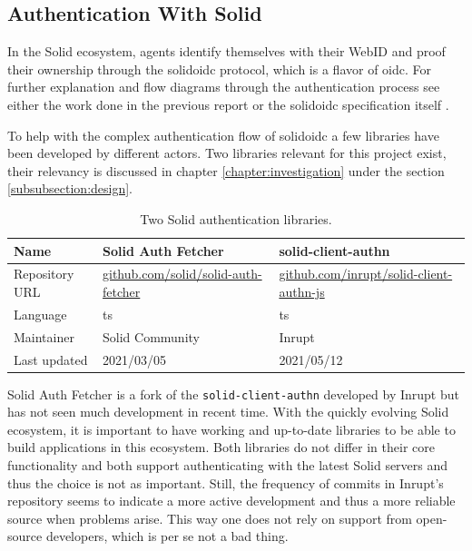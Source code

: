 \subsection{Authentication With Solid}

In the Solid ecosystem, agents identify themselves with their WebID and proof their ownership through the \gls{solidoidc} protocol, which is a flavor of \gls{oidc}. For further explanation and flow diagrams through the authentication process see either the work done in the previous report \cite{cern-solid-investigation-spec} or the \gls{solidoidc} specification itself \cite{solid-ecosystem-oidc}.

To help with the complex authentication flow of \gls{solidoidc} a few libraries have been developed by different actors. Two libraries relevant for this project exist, their relevancy is discussed in chapter \ref{chapter:investigation} under the section \ref{subsubsection:design}.

\begin{table}[h!]
    \centering
    \begin{tabular}{| l | l | l |} 
     \hline
     Name & Solid Auth Fetcher & solid-client-authn \\
     \hline
     Repository URL & \url{github.com/solid/solid-auth-fetcher} & \url{github.com/inrupt/solid-client-authn-js} \\
     \hline
     Language & \gls{ts} & \gls{ts} \\
     \hline
     Maintainer & Solid Community & Inrupt \\
     \hline
     Last updated & 2021/03/05 & 2021/05/12 \\
     \hline
    \end{tabular}
    \vspace{0.75cm}
    \caption{Two Solid authentication libraries.}
    \label{table:0}
\end{table}

Solid Auth Fetcher is a fork of the \texttt{solid-client-authn} developed by Inrupt but has not seen much development in recent time. With the quickly evolving Solid ecosystem, it is important to have working and up-to-date libraries to be able to build applications in this ecosystem. Both libraries do not differ in their core functionality and both support authenticating with the latest Solid servers and thus the choice is not as important. Still, the frequency of commits in Inrupt's repository seems to indicate a more active development and thus a more reliable source when problems arise. This way one does not rely on support from open-source developers, which is per se not a bad thing.

